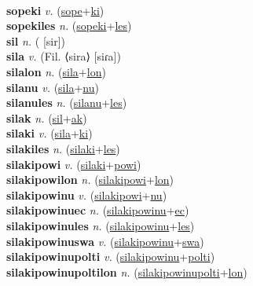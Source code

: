  \label{sopelon} \\
\textbf{sopeki} \textit{v.} (\hyperref[sope]{sope}+\hyperref[ki]{ki})
 \label{sopeki} \\
\textbf{sopekiles} \textit{n.} (\hyperref[sopeki]{sopeki}+\hyperref[les]{les})
 \label{sopekiles} \\
\textbf{sil} \textit{n.} ( [sir])
 \label{sil} \\
\textbf{sila} \textit{v.} (Fil. ⟨sira⟩ [siɾa])
 \label{sila} \\
\textbf{silalon} \textit{n.} (\hyperref[sila]{sila}+\hyperref[lon]{lon})
 \label{silalon} \\
\textbf{silanu} \textit{v.} (\hyperref[sila]{sila}+\hyperref[nu]{nu})
 \label{silanu} \\
\textbf{silanules} \textit{n.} (\hyperref[silanu]{silanu}+\hyperref[les]{les})
 \label{silanules} \\
\textbf{silak} \textit{n.} (\hyperref[sil]{sil}+\hyperref[ak]{ak})
 \label{silak} \\
\textbf{silaki} \textit{v.} (\hyperref[sila]{sila}+\hyperref[ki]{ki})
 \label{silaki} \\
\textbf{silakiles} \textit{n.} (\hyperref[silaki]{silaki}+\hyperref[les]{les})
 \label{silakiles} \\
\textbf{silakipowi} \textit{v.} (\hyperref[silaki]{silaki}+\hyperref[powi]{powi})
 \label{silakipowi} \\
\textbf{silakipowilon} \textit{n.} (\hyperref[silakipowi]{silakipowi}+\hyperref[lon]{lon})
 \label{silakipowilon} \\
\textbf{silakipowinu} \textit{v.} (\hyperref[silakipowi]{silakipowi}+\hyperref[nu]{nu})
 \label{silakipowinu} \\
\textbf{silakipowinuec} \textit{n.} (\hyperref[silakipowinu]{silakipowinu}+\hyperref[ec]{ec})
 \label{silakipowinuec} \\
\textbf{silakipowinules} \textit{n.} (\hyperref[silakipowinu]{silakipowinu}+\hyperref[les]{les})
 \label{silakipowinules} \\
\textbf{silakipowinuswa} \textit{v.} (\hyperref[silakipowinu]{silakipowinu}+\hyperref[swa]{swa})
 \label{silakipowinuswa} \\
\textbf{silakipowinupolti} \textit{v.} (\hyperref[silakipowinu]{silakipowinu}+\hyperref[polti]{polti})
 \label{silakipowinupolti} \\
\textbf{silakipowinupoltilon} \textit{n.} (\hyperref[silakipowinupolti]{silakipowinupolti}+\hyperref[lon]{lon})
 \label{silakipowinupoltilon} \\
